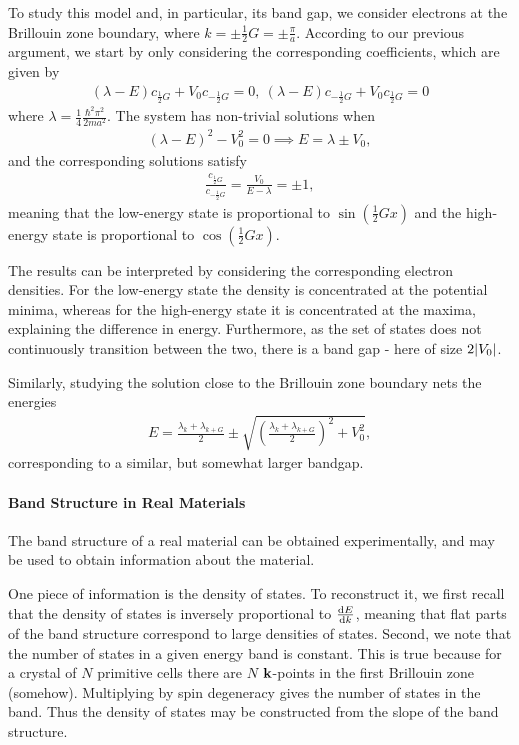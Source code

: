 To study this model and, in particular, its band gap, we consider electrons at the Brillouin zone boundary, where $k = \pm\frac{1}{2}G = \pm\frac{\pi}{a}$. According to our previous argument, we start by only considering the corresponding coefficients, which are given by
\begin{align*}
	\left(\lambda - E\right)c_{\frac{1}{2}G} + V_{0}c_{-\frac{1}{2}G} = 0,\ \left(\lambda - E\right)c_{-\frac{1}{2}G} + V_{0}c_{\frac{1}{2}G} = 0
\end{align*}
where $\lambda = \frac{1}{4}\frac{\hbar^{2}\pi^{2}}{2ma^{2}}$. The system has non-trivial solutions when
\begin{align*}
	\left(\lambda - E\right)^{2} - V_{0}^{2} = 0\implies E = \lambda \pm V_{0},
\end{align*}
and the corresponding solutions satisfy
\begin{align*}
	\frac{c_{\frac{1}{2}G}}{c_{-\frac{1}{2}G}} = \frac{V_{0}}{E - \lambda} = \pm 1,
\end{align*}
meaning that the low-energy state is proportional to $\sin(\frac{1}{2}Gx)$ and the high-energy state is proportional to $\cos(\frac{1}{2}Gx)$.

The results can be interpreted by considering the corresponding electron densities. For the low-energy state the density is concentrated at the potential minima, whereas for the high-energy state it is concentrated at the maxima, explaining the difference in energy. Furthermore, as the set of states does not continuously transition between the two, there is a band gap - here of size $2\abs{V_{0}}$.

Similarly, studying the solution close to the Brillouin zone boundary nets the energies
\begin{align*}
	E = \frac{\lambda_{k} + \lambda_{k + G}}{2} \pm\sqrt{\left(\frac{\lambda_{k} + \lambda_{k + G}}{2}\right)^{2} + V_{0}^{2}},
\end{align*}
corresponding to a similar, but somewhat larger bandgap.

\paragraph{Band Structure in Real Materials}
The band structure of a real material can be obtained experimentally, and may be used to obtain information about the material.

One piece of information is the density of states. To reconstruct it, we first recall that the density of states is inversely proportional to $\dv{E}{k}$, meaning that flat parts of the band structure correspond to large densities of states. Second, we note that the number of states in a given energy band is constant. This is true because for a crystal of $N$ primitive cells there are $N$ $\vb{k}$-points in the first Brillouin zone (somehow). Multiplying by spin degeneracy gives the number of states in the band. Thus the density of states may be constructed from the slope of the band structure.

